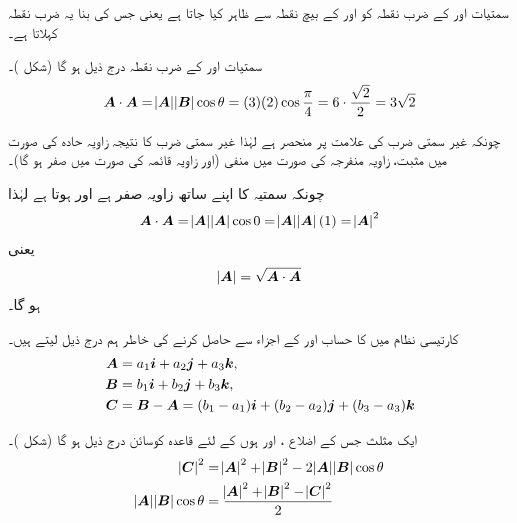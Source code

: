 سمتیات  اور  کے ضرب نقطہ کو  اور  کے بیچ نقطہ سے ظاہر کیا جاتا ہے یعنی  جس کی بنا یہ ضرب نقطہ کہلاتا ہے۔

سمتیات  اور  کے ضرب نقطہ درج ذیل ہو گا (شکل )۔
\begin{align*}
{\ensuremath{{\boldsymbol{A}}}}\cdot{\ensuremath{{\boldsymbol{A}}}}=\abs{{{\boldsymbol{A}}}}\abs{{{\boldsymbol{B}}}}\cos\theta=(3)(2)\cos\frac{\pi}{4}=6\cdot\frac{\sqrt{2}}{2}=3\sqrt{2}
\end{align*}

چونکہ غیر سمتی ضرب کی علامت  پر منحصر ہے لہٰذا غیر سمتی ضرب کا نتیجہ زاویہ حادہ کی صورت میں مثبت، زاویہ منفرجہ کی صورت میں  منفی (اور زاویہ قائمہ کی صورت میں صفر ہو گا)۔

چونکہ سمتیہ  کا اپنے ساتھ زاویہ صفر ہے  اور  ہوتا ہے لہٰذا
\begin{align*}
{\ensuremath{{\boldsymbol{A}}}}\cdot {\ensuremath{{\boldsymbol{A}}}}=\abs{{{\boldsymbol{A}}}}\abs{{{\boldsymbol{A}}}}\cos 0=\abs{{{\boldsymbol{A}}}}\abs{{{\boldsymbol{A}}}}(1)=\abs{{{\boldsymbol{A}}}}^2
\end{align*}
یعنی
\begin{align}
\abs{{{\boldsymbol{A}}}}=\sqrt{{{\boldsymbol{A}}}\cdot {\ensuremath{{\boldsymbol{A}}}}}
\end{align}
ہو گا۔

کارتیسی نظام میں  کا حساب  اور  کے اجزاء سے حاصل کرنے کی خاطر ہم درج ذیل لیتے ہیں۔
\begin{align*}
{\ensuremath{{\boldsymbol{A}}}}&=a_1{\boldsymbol{i}}+a_2{\boldsymbol{j}}+a_3{\boldsymbol{k}},\\
{{\boldsymbol{B}}}&=b_1{\boldsymbol{i}}+b_2{\boldsymbol{j}}+b_3{\boldsymbol{k}},\\
{{\boldsymbol{C}}}&={{\boldsymbol{B}}}-{{\boldsymbol{A}}}=(b_1-a_1){\boldsymbol{i}}+(b_2-a_2){\boldsymbol{j}}+(b_3-a_3){\boldsymbol{k}}
\end{align*}

ایک مثلث جس کے اضلاع ،  اور  ہوں کے لئے قاعدہ کوسائن درج ذیل ہو گا (شکل )۔
\begin{align*}
\abs{{{\boldsymbol{C}}}}^2&=\abs{{{\boldsymbol{A}}}}^2+\abs{{{\boldsymbol{B}}}}^2-2\abs{{{\boldsymbol{A}}}}\abs{{{\boldsymbol{B}}}}\cos\theta\\
\abs{{{\boldsymbol{A}}}}\abs{{{\boldsymbol{B}}}}\cos\theta&=\frac{\abs{{{\boldsymbol{A}}}}^2+\abs{{{\boldsymbol{B}}}}^2-\abs{{{\boldsymbol{C}}}}^2}{2}
\end{align*} 

